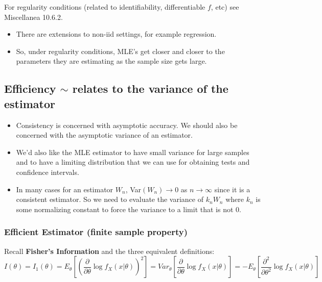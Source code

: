 \documentclass[11pt,]{article}
\begin{document}
For regularity conditions (related to identifiability, differentiable
\(f\), etc) see Miscellanea 10.6.2.

\begin{itemize}
\item There are extensions to non-iid settings, for example regression.
\item So, under regularity conditions, MLE's get closer and closer to the parameters they are estimating as the sample size gets large.
\end{itemize}

\hypertarget{efficiency-sim-relates-to-the-variance-of-the-estimator}{%
\subsection{\texorpdfstring{Efficiency \(\sim\) relates to the variance
of the
estimator}{Efficiency \textbackslash{}sim relates to the variance of the estimator}}\label{efficiency-sim-relates-to-the-variance-of-the-estimator}}

\begin{itemize}
\item Consistency is concerned with asymptotic accuracy. We should also be concerned with the asymptotic variance of an estimator.
\item We'd also like the MLE estimator to have small variance for large samples and to have a limiting distribution that we can use for obtaining tests and confidence intervals.
\item In many cases for an estimator $W_n$, Var$(W_n) \to 0$ as $n\to \infty$ since it is a consistent estimator. So we need to evaluate the variance of $k_n W_n$ where $k_n$ is some normalizing constant to force the variance to a limit that is not 0.
\end{itemize}

\hypertarget{efficient-estimator-finite-sample-property}{%
\subsubsection{Efficient Estimator (finite sample
property)}\label{efficient-estimator-finite-sample-property}}

Recall \textbf{Fisher's Information} and the three equivalent
definitions:
\[I(\theta) = I_1(\theta) = E_\theta\left[\left(\frac{\partial}{\partial\theta} \log f_X(x|\theta)\right)^2\right] =
Var_\theta\left[\frac{\partial}{\partial\theta}  \log f_X(x|\theta)\right] = 
 - E_\theta\left[\frac{\partial^2}{\partial \theta^2} \log f_X(x|\theta)\right]\]
\end{document}
